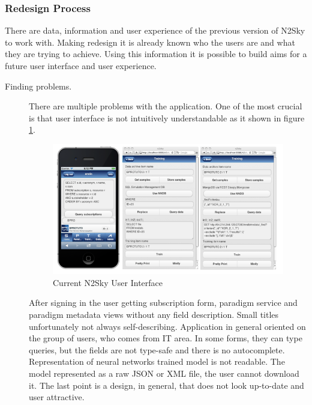 \subsubsection{Redesign Process }\label{Redesign Process}

There are data, information and user experience of the previous version of N2Sky to work with. Making redesign it is already known who the users are and what they are trying to achieve.  Using this information it is possible to build aims for a future user interface and user experience.


\begin{description}

\item[Finding problems.]  There are multiple problems with the application. One of the most crucial is that user interface is not intuitively understandable as it shown in figure \ref{fig:old_arch}. 
\begin{figure}[htbp]
\begin{center}
  \includegraphics[width=\linewidth]{components/2/old_arch.png}
  \caption{Current N2Sky User Interface}
  \label{fig:old_arch}
\end{center}
\end{figure}


After signing in the user getting subscription form, paradigm service and paradigm metadata views without any field description. Small titles unfortunately not always self-describing. Application in general oriented on the group of users, who comes from IT area. In some forms, they can type queries, but the fields are not type-safe and there is no autocomplete.
Representation of neural networks trained model is not readable. The model represented as a raw JSON or XML file, the user cannot download it. The last point is a design, in general, that does not look up-to-date and user attractive. 



\end{description}
